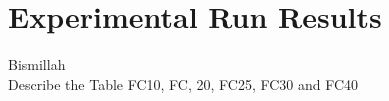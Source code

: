 
\section{Experimental Run Results}

Bismillah\\

Describe the Table FC10, FC, 20, FC25, FC30 and FC40\\



